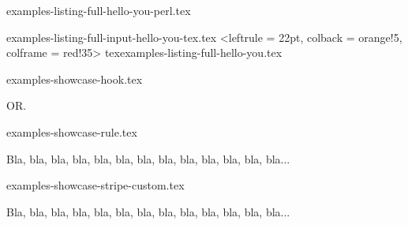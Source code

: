 \begin{filecontents*}[overwrite]{examples-listing-full-hello-you-perl.tex}
\end{filecontents*}


\begin{filecontents*}[overwrite]{examples-listing-full-input-hello-you-tex.tex}
\tdoccodeinput[style = solarized-light, linenos]%
              <leftrule = 22pt, colback = orange!5, colframe = red!35>%
              {tex}{examples-listing-full-hello-you.tex}
\end{filecontents*}


\begin{filecontents*}[overwrite]{examples-showcase-hook.tex}
\begin{tdocshowcase}
\end{tdocshowcase}

OR.

\begin{tdocshowcase}
\end{tdocshowcase}
\end{filecontents*}


\begin{filecontents*}[overwrite]{examples-showcase-rule.tex}
\begin{tdocshowcase}[style = rule]
    Bla, bla, bla, bla, bla, bla, bla, bla, bla, bla, bla, bla, bla...
\end{tdocshowcase}
\end{filecontents*}


\begin{filecontents*}[overwrite]{examples-showcase-stripe-custom.tex}
\begin{tdocshowcase}[style      = stripe,
                     col-stripe = green,
                     col-text   = purple,
                     before     = Mon début,
                     after      = Ma fin à moi]
    Bla, bla, bla, bla, bla, bla, bla, bla, bla, bla, bla, bla, bla...
\end{tdocshowcase}
\end{filecontents*}



